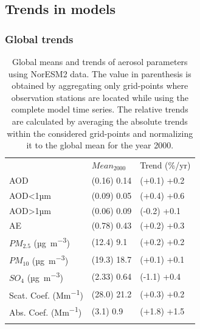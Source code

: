 \documentclass[journal abbreviation, manuscript]{copernicus}
\begin{document}
\subsection{Trends in models}

\subsubsection{Global trends}

\begin{table}
 \begin{tabular}{lll}
  \tophline
                                & $Mean_{2000}$ & Trend (\%/yr) \\
  \middlehline
  AOD                           & (0.16) 0.14   & (+0.1) +0.2   \\
  AOD<1µm                       & (0.09) 0.05   & (+0.4) +0.6   \\
  AOD>1µm                       & (0.06) 0.09   & (-0.2) +0.1   \\
  AE                            & (0.78) 0.43   & (+0.2) +0.3   \\
  $PM_{2.5}$ (\unit{µg.m^{-3}}) & (12.4) 9.1    & (+0.2) +0.2   \\
  $PM_{10}$ (\unit{µg.m^{-3}})  & (19.3) 18.7   & (+0.1) +0.1   \\
  $SO_{4}$ (\unit{µg.m^{-3}})   & (2.33) 0.64   & (-1.1) +0.4   \\
  Scat. Coef. (\unit{Mm^{-1}})  & (28.0) 21.2   & (+0.3) +0.2   \\
  Abs. Coef. (\unit{Mm^{-1}})   & (3.1) 0.9     & (+1.8) +1.5   \\
  \bottomhline
 \end{tabular}
 \caption{Global means and trends of aerosol parameters using NorESM2 data. The value in parenthesis is obtained by aggregating only grid-points where observation stations are located while using the complete model time series. The relative trends are calculated by averaging the absolute trends within the considered grid-points and normalizing it to the global mean for the year 2000.}
 \label{table:global_trends}
\end{table}
\end{document}
